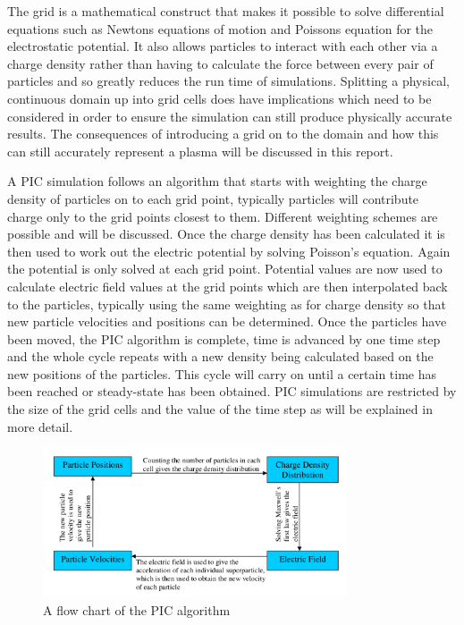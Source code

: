 \documentclass[12pt]{article}
\begin{document}
The grid is a mathematical construct that makes it possible to solve differential equations such as Newtons equations of motion and Poissons equation for the electrostatic potential. It also allows particles to interact with each other via a charge density rather than having to calculate the force between every pair of particles and so greatly reduces the run time of simulations. Splitting a physical, continuous domain  up into grid cells does have implications which need to be considered in order to ensure the simulation can still produce physically accurate results. The consequences of introducing a grid on to the domain and how this can still accurately represent a plasma will be discussed in this report.

A PIC simulation follows an algorithm that starts with weighting the charge density of particles on to each grid point, typically particles will contribute charge only to the grid points closest to them. Different weighting schemes are possible and will be discussed. Once the charge density has been calculated it is then used to work out the electric potential by solving Poisson's equation. Again the potential is only solved at each grid point. Potential values are now used to calculate electric field values at the grid points which are then interpolated back to the particles, typically using the same weighting as for charge density so that new particle velocities and positions can be determined. Once the particles have been moved, the PIC algorithm is complete, time is advanced by one time step and the whole cycle repeats with a new density being calculated based on the new positions of the particles. This cycle will carry on until a certain time has been reached or steady-state has been obtained. PIC simulations are restricted by the size of the grid cells and the value of the time step as will be explained in more detail.
\begin{figure}[H]
\centering
\includegraphics[width=0.8\textwidth]{piccycle}
\caption{A flow chart of the PIC algorithm \cite{loop}}
\label{fig:Leapfrog}
\end{figure}
\end{document}
